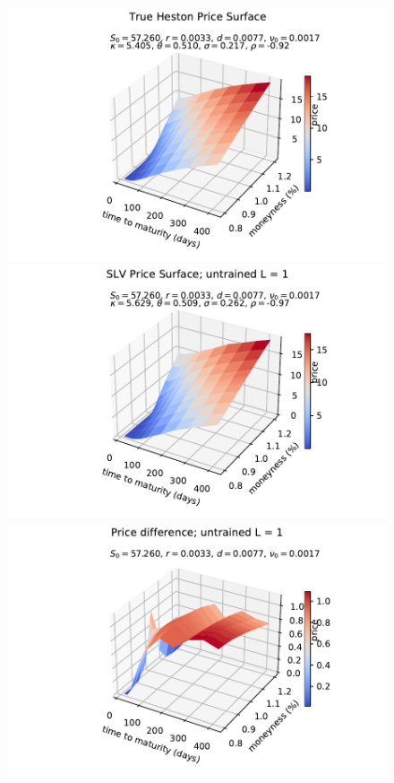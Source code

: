 \documentclass[
a4paper,     %
12pt           %
]{scrartcl}  %
\numberwithin{equation}{section}
\begin{document}
\begin{figure}
\begin{minipage}[Ausrichtung]{0.329\textwidth}
	\end{minipage}
	\begin{minipage}[Ausrichtung]{0.329\textwidth}
		\includegraphics[width=\textwidth]{fig/Psurf_orginal_2017-01-05}
	\end{minipage}
	\begin{minipage}[Ausrichtung]{0.329\textwidth}
		\includegraphics[width=\textwidth]{fig/Psurf_untrained_2017-01-05}
	\end{minipage}
	\begin{minipage}[Ausrichtung]{0.329\textwidth}
		\includegraphics[width=\textwidth]{fig/Psurf_untrained_diff_2017-01-05_rec_3lay_seed1}

\end{minipage}
\end{figure}
\end{document}
